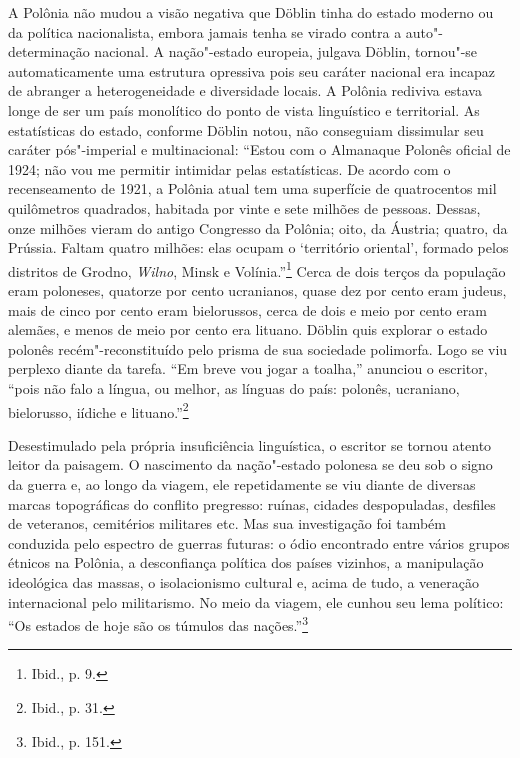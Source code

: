 A Polônia não mudou a visão negativa que Döblin tinha do estado moderno
ou da política nacionalista, embora jamais tenha se virado contra a
auto"-determinação nacional. A nação"-estado europeia, julgava Döblin,
tornou"-se automaticamente uma estrutura opressiva pois seu caráter
nacional era incapaz de abranger a heterogeneidade e diversidade locais.
A Polônia rediviva estava longe de ser um país monolítico do ponto de
vista linguístico e territorial. As estatísticas do estado, conforme
Döblin notou, não conseguiam dissimular seu caráter pós"-imperial e
multinacional: ``Estou com o Almanaque Polonês oficial de 1924; não vou
me permitir intimidar pelas estatísticas. De acordo com o recenseamento
de 1921, a Polônia atual tem uma superfície de quatrocentos mil
quilômetros quadrados, habitada por vinte e sete milhões de pessoas.
Dessas, onze milhões vieram do antigo Congresso da Polônia; oito, da
Áustria; quatro, da Prússia. Faltam quatro milhões: elas ocupam o
`território oriental', formado pelos distritos de Grodno, \textit{Wilno}, Minsk e
Volínia.''\footnote{Ibid., p. 9.} Cerca de dois terços da população eram
poloneses, quatorze por cento ucranianos, quase dez por cento eram
judeus, mais de cinco por cento eram bielorussos, cerca de dois e meio
por cento eram alemães, e menos de meio por cento era lituano. Döblin
quis explorar o estado polonês recém"-reconstituído pelo prisma de sua
sociedade polimorfa. Logo se viu perplexo diante da tarefa. ``Em breve
vou jogar a toalha,'' anunciou o escritor, ``pois não falo a língua, ou
melhor, as línguas do país: polonês, ucraniano, bielorusso, iídiche e
lituano.''\footnote{Ibid., p. 31.}

%

Desestimulado pela própria insuficiência linguística, o escritor se
tornou atento leitor da paisagem. O nascimento da nação"-estado polonesa
se deu sob o signo da guerra e, ao longo da viagem, ele repetidamente se
viu diante de diversas marcas topográficas do conflito pregresso:
ruínas, cidades despopuladas, desfiles de veteranos, cemitérios
militares etc. Mas sua investigação foi também conduzida pelo espectro
de guerras futuras: o ódio encontrado entre vários grupos étnicos na
Polônia, a desconfiança política dos países vizinhos, a manipulação
ideológica das massas, o isolacionismo cultural e, acima de tudo, a
veneração internacional pelo militarismo. No meio da viagem, ele cunhou
seu lema político: ``Os estados de hoje são os túmulos das
nações.''\footnote{Ibid., p. 151.}

